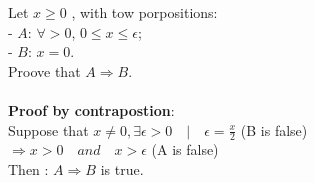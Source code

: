 \documentclass{article}
\begin{document}
\noindent Let $x \geq 0$ , with tow porpositions:\\
- $A$: $\forall > 0$, $0 \leq x \leq \epsilon$;\\
- $B$: $x = 0$.\\
\noindent Proove that $A \Rightarrow B$.\\\\
\noindent \textbf{Proof by contrapostion}:\\
Suppose that $x \neq 0, \exists \epsilon > 0 \quad|\quad
\epsilon = \frac{x}{2} $ (B is false)\\
$\Rightarrow x > 0 \quad and \quad x > \epsilon$ (A is false)\\
Then : $A \Rightarrow B$ is true.
\end{document}
